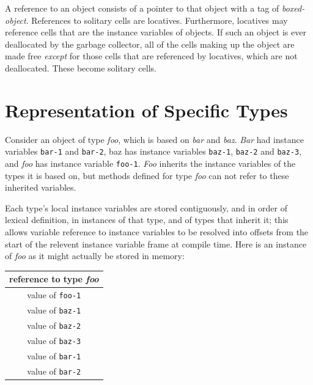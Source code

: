A reference to an object consists of a pointer to that object with a
tag of \emph{boxed-object}.  References to solitary cells are locatives.
Furthermore, locatives may reference cells that are the instance
variables of objects.  If such an object is ever deallocated by the
garbage collector, all of the cells making up the object are made free
\emph{except} for those cells that are referenced by locatives, which are
not deallocated.  These become solitary cells.

\section{Representation of Specific Types}

Consider an object of type \emph{foo}, which is based on \emph{bar} and
\emph{baz}.  \emph{Bar} had instance variables \texttt{bar-1} and \texttt{bar-2}, baz
has instance variables \texttt{baz-1}, \texttt{baz-2} and \texttt{baz-3}, and \emph{foo}
has instance variable \texttt{foo-1}.  \emph{Foo} inherits the instance
variables of the types it is based on, but methods defined for type
\emph{foo} can not refer to these inherited variables.

Each type's local instance variables are stored contiguously, and in
order of lexical definition, in instances of that type, and of types
that inherit it; this allows variable reference to instance variables
to be resolved into offsets from the start of the relevent instance
variable frame at compile time.  Here is an instance of \emph{foo} as
it might actually be stored in memory:

\begin{center}
\begin{tabular}{|c|} \hline
 reference to type \emph{foo} \\ \hline\hline
 value of \texttt{foo-1} \\ \hline\hline
 value of \texttt{baz-1} \\ \hline
 value of \texttt{baz-2} \\ \hline
 value of \texttt{baz-3} \\ \hline\hline
 value of \texttt{bar-1} \\ \hline
 value of \texttt{bar-2} \\ \hline
\end{tabular}
\end{center}

